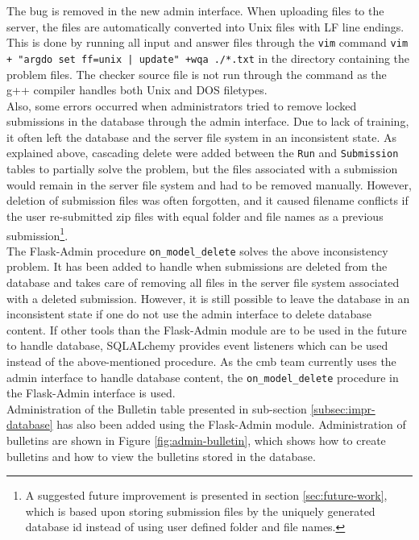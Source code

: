 The bug is removed in the new admin interface. When uploading files to the server, the files are automatically converted into Unix files with LF line endings. This is done by running all input and answer files through the \texttt{vim} \cite{VIM} command \texttt{vim + "argdo set ff=unix | update" +wqa ./*.txt} in the directory containing the problem files. The checker source file is not run through the command as the g++ compiler handles both Unix and DOS filetypes. \\

Also, some errors occurred when administrators tried to remove locked submissions in the database through the admin interface. Due to lack of training, it often left the database and the server file system in an inconsistent state. As explained above, cascading delete were added between the \texttt{Run} and \texttt{Submission} tables to partially solve the problem, but the files associated with a submission would remain in the server file system and had to be removed manually. However, deletion of submission files was often forgotten, and it caused filename conflicts if the user re-submitted zip files with equal folder and file names as a previous submission\footnote{A suggested future improvement is presented in section \ref{sec:future-work}, which is based upon storing submission files by the uniquely generated database id instead of using user defined folder and file names.}.\\

The Flask-Admin \cite{FLASKADMIN} procedure \texttt{on\_model\_delete} solves the above inconsistency problem. It has been added to handle when submissions are deleted from the database and takes care of removing all files in the server file system associated with a deleted submission. However, it is still possible to leave the database in an inconsistent state if one do not use the admin interface to delete database content. If other tools than the Flask-Admin module are to be used in the future to handle database, SQLALchemy provides event listeners which can be used instead of the above-mentioned procedure. As the \gls{cmb} team currently uses the admin interface to handle database content, the \texttt{on\_model\_delete} procedure in the Flask-Admin interface is used. \\

Administration of the Bulletin table presented in sub-section \ref{subsec:impr-database} has also been added using the Flask-Admin module. Administration of bulletins are shown in Figure \ref{fig:admin-bulletin}, which shows how to create bulletins and how to view the bulletins stored in the database.

